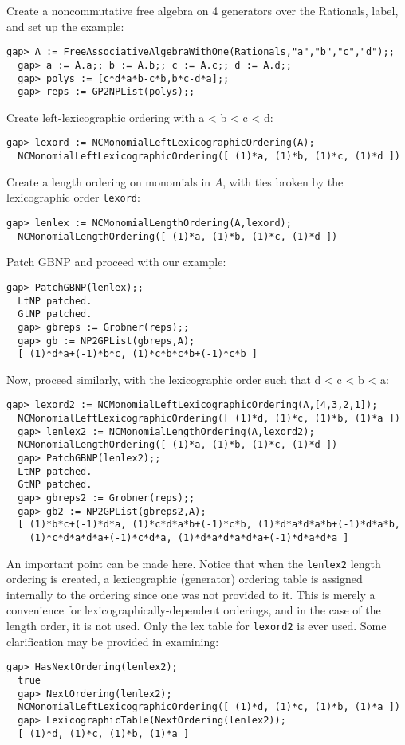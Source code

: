 \documentclass[a4paper,11pt]{report}
\begin{document}
{{{ Create a noncommutative free algebra on 4 generators over the Rationals,
label, and set up the example: 
\begin{Verbatim}[fontsize=\small,frame=single,label=Example]
  gap> A := FreeAssociativeAlgebraWithOne(Rationals,"a","b","c","d");;
  gap> a := A.a;; b := A.b;; c := A.c;; d := A.d;;
  gap> polys := [c*d*a*b-c*b,b*c-d*a];;
  gap> reps := GP2NPList(polys);;
\end{Verbatim}
 Create left-lexicographic ordering with a {\textless} b {\textless} c
{\textless} d: 
\begin{Verbatim}[fontsize=\small,frame=single,label=Example]
  gap> lexord := NCMonomialLeftLexicographicOrdering(A);
  NCMonomialLeftLexicographicOrdering([ (1)*a, (1)*b, (1)*c, (1)*d ])
\end{Verbatim}
 Create a length ordering on monomials in $A$, with ties broken by the lexicographic order \texttt{lexord}: 
\begin{Verbatim}[fontsize=\small,frame=single,label=Example]
  gap> lenlex := NCMonomialLengthOrdering(A,lexord);
  NCMonomialLengthOrdering([ (1)*a, (1)*b, (1)*c, (1)*d ])
\end{Verbatim}
 Patch \textsf{GBNP} and proceed with our example: 
\begin{Verbatim}[fontsize=\small,frame=single,label=Example]
  gap> PatchGBNP(lenlex);;
  LtNP patched.
  GtNP patched.
  gap> gbreps := Grobner(reps);;
  gap> gb := NP2GPList(gbreps,A);
  [ (1)*d*a+(-1)*b*c, (1)*c*b*c*b+(-1)*c*b ]
\end{Verbatim}
 Now, proceed similarly, with the lexicographic order such that d {\textless} c
{\textless} b {\textless} a: 
\begin{Verbatim}[fontsize=\small,frame=single,label=Example]
  gap> lexord2 := NCMonomialLeftLexicographicOrdering(A,[4,3,2,1]);
  NCMonomialLeftLexicographicOrdering([ (1)*d, (1)*c, (1)*b, (1)*a ])
  gap> lenlex2 := NCMonomialLengthOrdering(A,lexord2);
  NCMonomialLengthOrdering([ (1)*a, (1)*b, (1)*c, (1)*d ])
  gap> PatchGBNP(lenlex2);;
  LtNP patched.
  GtNP patched.
  gap> gbreps2 := Grobner(reps);;
  gap> gb2 := NP2GPList(gbreps2,A);
  [ (1)*b*c+(-1)*d*a, (1)*c*d*a*b+(-1)*c*b, (1)*d*a*d*a*b+(-1)*d*a*b,
    (1)*c*d*a*d*a+(-1)*c*d*a, (1)*d*a*d*a*d*a+(-1)*d*a*d*a ]
\end{Verbatim}
 An important point can be made here. Notice that when the \texttt{lenlex2} length ordering is created, a lexicographic (generator) ordering table is
assigned internally to the ordering since one was not provided to it. This is
merely a convenience for lexicographically-dependent orderings, and in the
case of the length order, it is not used. Only the lex table for \texttt{lexord2} is ever used. Some clarification may be provided in examining: 
\begin{Verbatim}[fontsize=\small,frame=single,label=Example]
  gap> HasNextOrdering(lenlex2);
  true
  gap> NextOrdering(lenlex2);
  NCMonomialLeftLexicographicOrdering([ (1)*d, (1)*c, (1)*b, (1)*a ])
  gap> LexicographicTable(NextOrdering(lenlex2));
  [ (1)*d, (1)*c, (1)*b, (1)*a ]
\end{Verbatim}
 }

}}
\end{document}
